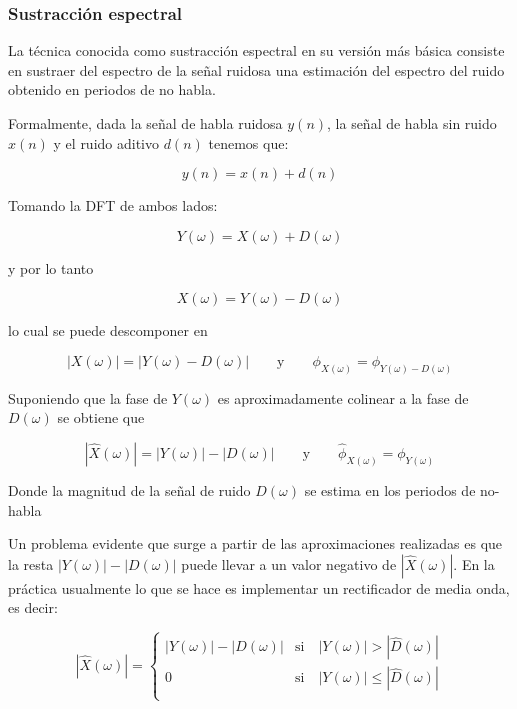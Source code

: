 \subsubsection{Sustracción espectral}
\label{sec:sustraccion_espectral}

La técnica conocida como sustracción espectral en su versión más básica consiste en sustraer del espectro de la señal ruidosa una estimación del espectro del ruido obtenido en periodos de no habla.

Formalmente, dada la señal de habla ruidosa $y(n)$, la señal de habla sin ruido $x(n)$ y el ruido aditivo $d(n)$ tenemos que:

\begin{equation*}
	y(n) = x(n) + d(n)
\end{equation*}

Tomando la DFT de ambos lados:

\begin{equation*}
	Y(\omega) = X(\omega) + D(\omega)
\end{equation*}

y por lo tanto

\begin{equation*}
	X(\omega) = Y(\omega) - D(\omega)
\end{equation*}

lo cual se puede descomponer en

\begin{equation*}
	|X(\omega)| = |Y(\omega) - D(\omega)| \qquad \text{y} \qquad \phi_{X(\omega)} = \phi_{Y(\omega) - D(\omega)}
\end{equation*}

Suponiendo que la fase de $Y(\omega)$ es aproximadamente colinear a la fase de $D(\omega)$ se obtiene que

\begin{equation*}
	|\hat{X}(\omega)| = |Y(\omega)| - |D(\omega)| \qquad \text{y} \qquad \hat{\phi}_{X(\omega)} = \phi_{Y(\omega)}
\end{equation*}

Donde la magnitud de la señal de ruido $D(\omega)$ se estima en los periodos de no-habla

Un problema evidente que surge a partir de las aproximaciones realizadas es que la resta $|Y(\omega)| - |D(\omega)|$ puede llevar a un valor negativo de $|\hat{X}(\omega)|$. En la práctica usualmente lo que se hace es implementar un rectificador de media onda, es decir:

\begin{equation*}
	|\hat{X}(\omega)| = \begin{cases} 
		|Y(\omega)| - |D(\omega)| & \text{si} \quad |Y(\omega)| >  |\hat{D}(\omega)| \\
		0 & \text{si} \quad |Y(\omega)| \leq  |\hat{D}(\omega)|\\
	\end{cases}
\end{equation*}

